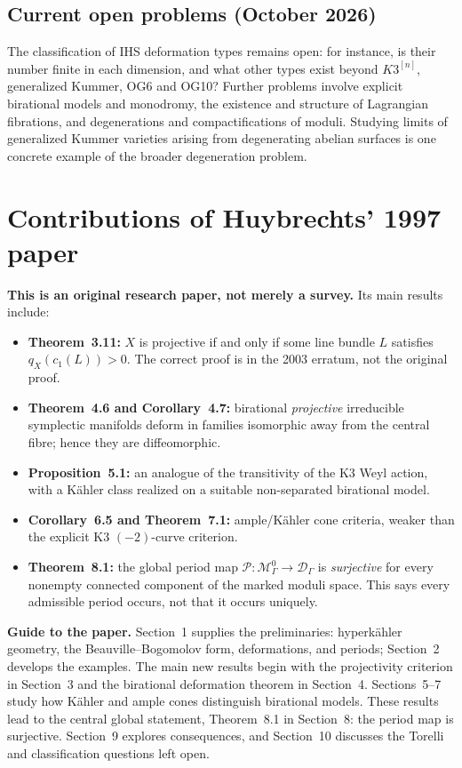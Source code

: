 \documentclass[11pt]{article}
\begin{document}
\subsection{Current open problems (October 2026)}
The classification of IHS deformation
types remains open: for instance, is
their number finite in each dimension,
and what other types exist beyond
$K3^{[n]}$, generalized Kummer, OG6
and OG10? Further problems involve
explicit birational models and monodromy,
the existence and structure of Lagrangian
fibrations, and degenerations and
compactifications of moduli.
Studying limits
of generalized Kummer varieties arising
from degenerating abelian surfaces is
one concrete example of the broader
degeneration problem.

\section{Contributions of Huybrechts' 1997 paper}

\noindent
\textbf{This is an original research paper, not merely a survey.}
Its main results include:
\begin{itemize}
\item \textbf{Theorem~3.11:} $X$ is projective
if and only if some line bundle $L$ satisfies
$q_X(c_1(L))>0$. The correct proof is in
the 2003 erratum, not the original proof.
\item \textbf{Theorem~4.6 and Corollary~4.7:}
birational \emph{projective} irreducible symplectic
manifolds deform in families isomorphic away from
the central fibre; hence they are diffeomorphic.
\item \textbf{Proposition~5.1:} an analogue of
the transitivity of the K3 Weyl action, with
a K\"ahler class realized on a suitable
non-separated birational model.
\item \textbf{Corollary~6.5 and Theorem~7.1:}
ample/K\"ahler cone criteria, weaker than
the explicit K3 $(-2)$-curve criterion.
\item \textbf{Theorem~8.1:} the global period map
$\mathcal P:\mathcal M_\Gamma^0\to\mathcal D_\Gamma$
is \emph{surjective} for every nonempty connected
component of the marked moduli space.
This says every admissible period occurs,
not that it occurs uniquely.
\end{itemize}

\medskip\noindent
\textbf{Guide to the paper.}
Section~1 supplies the preliminaries: hyperk\"ahler
geometry, the Beauville--Bogomolov form,
deformations, and periods; Section~2 develops
the examples. The main new results begin with
the projectivity criterion in Section~3 and
the birational deformation theorem in Section~4.
Sections~5--7 study how K\"ahler and ample
cones distinguish birational models. These
results lead to the central global statement,
Theorem~8.1 in Section~8: the period map is
surjective. Section~9 explores consequences,
and Section~10 discusses the Torelli and
classification questions left open.
\end{document}
